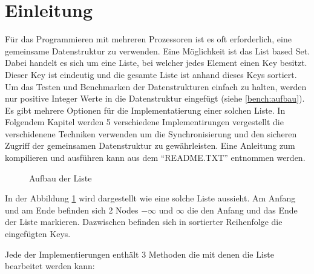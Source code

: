 \documentclass[10pt,a4paper,titlepage,oneside]{article}
\begin{document}
 

\maketitle  
 
\tableofcontents
\newpage  
\section{Einleitung}
Für das Programmieren mit mehreren Prozessoren ist es oft erforderlich, eine gemeinsame Datenstruktur zu verwenden. 
Eine Möglichkeit ist das List based Set. Dabei handelt es sich um eine Liste, bei welcher jedes Element einen Key besitzt.
Dieser Key ist eindeutig und die gesamte Liste ist anhand dieses Keys sortiert. 
Um das Testen und Benchmarken der Datenstrukturen einfach zu halten, werden nur positive Integer Werte in die Datenstruktur eingefügt (siehe \ref{bench:aufbau}). 
Es gibt mehrere Optionen für die Implementatierung einer solchen Liste. In Folgendem Kapitel werden 5 verschiedene Implementirungen vergestellt die verschidenene Techniken verwenden um die Synchronisierung und den sicheren Zugriff der gemeinsamen Datenstruktur zu gewährleisten. Eine Anleitung zum kompilieren und ausführen kann
aus dem ``README.TXT'' entnommen werden.

\begin{figure}[H]
	\centering 
	\caption{Aufbau der Liste}
	\label{tik:list}
\end{figure}

In der Abbildung \ref{tik:list} wird dargestellt wie eine solche Liste aussieht. Am Anfang und am Ende befinden sich 2 Nodes $-\infty$ und $\infty$ die den 
Anfang und das Ende der Liste markieren. Dazwischen befinden sich in sortierter Reihenfolge die eingefügten Keys.

Jede der Implementierungen enthält 3 Methoden die mit denen die Liste bearbeitet werden kann:
\end{document}
